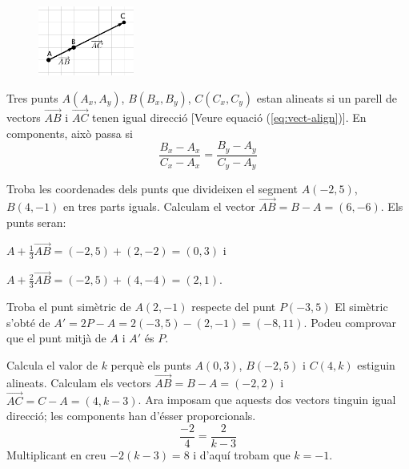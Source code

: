 \begin{theorybox}
	\begin{figure} 
		\vspace{-1.1cm}
		\begin{center}
			\includegraphics[width=0.28\textwidth]{img-09/alineats}
		\end{center}
	\end{figure}
	Tres punts $A(A_x, A_y)$, $B(B_x, B_y)$, $C(C_x, C_y)$ estan alineats si un parell de vectors $\overrightarrow{AB}$ i $\overrightarrow{AC}$ tenen igual direcció [Veure equació (\ref{eq:vect-align})]. En components, això passa si
	\begin{equation}
		\frac{B_x-A_x}{C_x-A_x}=\frac{B_y-A_y}{C_y-A_y}
	\end{equation}
	 
\end{theorybox}

\begin{resolt}[E]{Troba les coordenades dels punts que divideixen el segment $A(-2,5)$, $B(4,-1)$ en tres parts iguals.}
	Calculam el vector $\overrightarrow{AB}=B-A=(6,-6)$. Els punts seran:
	\vspace{0.2cm}
	
	$A+\frac{1}{3}\overrightarrow{AB}=(-2,5)+(2,-2)=(0,3)$ i
	\vspace{0.2cm}
	
	$A+\frac{2}{3}\overrightarrow{AB}=(-2,5)+(4,-4)=(2,1)$.
\end{resolt}
\begin{resolt}{Troba el punt simètric de $A(2,-1)$ respecte del punt $P(-3,5)$}
	\vspace{0.2cm}
	El simètric s'obté de $A' = 2P-A=2(-3,5)-(2,-1)=(-8, 11)$. Podeu comprovar que el punt mitjà de $A$ i $A'$ és $P$.
\end{resolt}
\begin{resolt}{Calcula el valor de $k$ perquè els punts $A(0,3)$, $B(-2, 5)$ i $C(4, k)$ estiguin alineats.}
	\vspace{0.2cm}
	Calculam els vectors $\overrightarrow{AB}=B-A=(-2, 2)$ i $\overrightarrow{AC}=C-A=(4,k-3)$. Ara imposam que aquests dos vectors tinguin igual direcció; les components han d'ésser proporcionals.
	\begin{equation*}
	\frac{-2}{4}=\frac{2}{k-3}
	\end{equation*}
	Multiplicant en creu $-2(k-3)=8$ i d'aquí trobam que $k=-1$.
\end{resolt}

